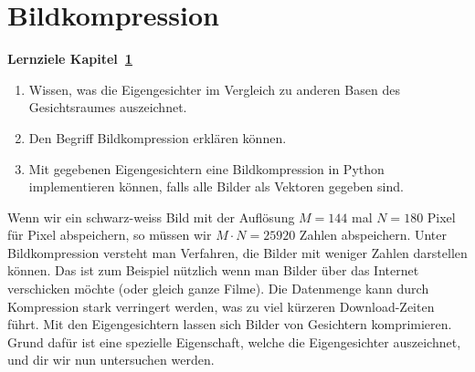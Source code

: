 \section{Bildkompression} \label{sec:compression}
\begin{tcolorbox}
	\centerline{\textbf{Lernziele Kapitel~\ref{sec:compression}}}
	\begin{enumerate}[leftmargin=*,label=\thesection.\arabic*]
		\item Wissen, was die Eigengesichter im Vergleich zu anderen Basen des Gesichtsraumes auszeichnet.
		\item Den Begriff Bildkompression erklären können.
		\item Mit gegebenen Eigengesichtern eine Bildkompression in Python implementieren können, falls alle Bilder als Vektoren gegeben sind.
	\end{enumerate}
\end{tcolorbox}
Wenn wir ein schwarz-weiss Bild mit der Auflösung $M=144$ mal $N=180$ Pixel für Pixel abspeichern, so müssen wir $M\cdot N=25920$ Zahlen abspeichern.
Unter Bildkompression versteht man Verfahren, die Bilder mit weniger Zahlen darstellen können.
Das ist zum Beispiel nützlich wenn man Bilder über das Internet verschicken möchte (oder gleich ganze Filme).
Die Datenmenge kann durch Kompression stark verringert werden, was zu viel kürzeren Download-Zeiten führt.
Mit den Eigengesichtern lassen sich Bilder von Gesichtern komprimieren.
Grund dafür ist eine spezielle Eigenschaft, welche die Eigengesichter auszeichnet, und dir wir nun untersuchen werden.

